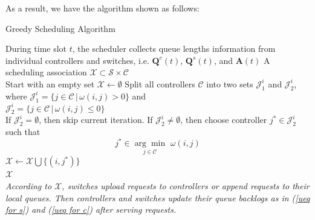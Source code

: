 \documentclass[10pt,journal,compsoc]{IEEEtran}
\begin{document}
As a result, we have the algorithm shown as follows:
\begin{algorithm}
 \caption{Greedy Scheduling Algorithm}
 \begin{algorithmic}[1]
 \renewcommand{\algorithmicrequire}{\textbf{Input:}}
 \renewcommand{\algorithmicensure}{\textbf{Output:}}
 \REQUIRE During time slot $t$, the scheduler collects queue lengths information from individual controllers and switches, i.e. $\mathbf{Q}^c(t)$, $\mathbf{Q}^s(t)$, and $\mathbf{A}(t)$
 \ENSURE  A scheduling association $\mathcal{X} \subset \mathcal{S} \times \mathcal{C}$
 \\
  \STATE Start with an empty set $\mathcal{X} \leftarrow \emptyset$ 
  	\STATE Split all controllers $\mathcal{C}$ into two sets $\mathcal{J}^i_1$ and $\mathcal{J}^i_2$, where
  	$\mathcal{J}^i_1 = \{ j \in \mathcal{C} \,|\, \omega(i,j) > 0 \}$ and \\
    $\mathcal{J}^i_2 = \{ j \in \mathcal{C} \,|\, \omega(i,j) \le 0 \}$ \\
    \STATE If $\mathcal{J}^i_2=\emptyset$, then skip current iteration.
    \STATE If $\mathcal{J}^i_2\neq\emptyset$, then choose controller $j^* \in \mathcal{J}^i_2$ such that
		$$\displaystyle j^* \in \underset{j \in \mathcal{C}}{\arg\min}\,\, \omega(i, j)$$
	\STATE $\mathcal{X} \leftarrow \mathcal{X}\bigcup\{(i,j^*)\}$
 \ENDFOR \\
 \RETURN $\mathcal{X}$ \\
 \textit{According to $\mathcal{X}$, switches upload requests to controllers or append requests to their local queues. Then controllers and switches update their queue backlogs as in (\ref{ueq for s}) and (\ref{ueq for c}) after serving requests.} 
 \end{algorithmic}
 \end{algorithm}
\end{document}
